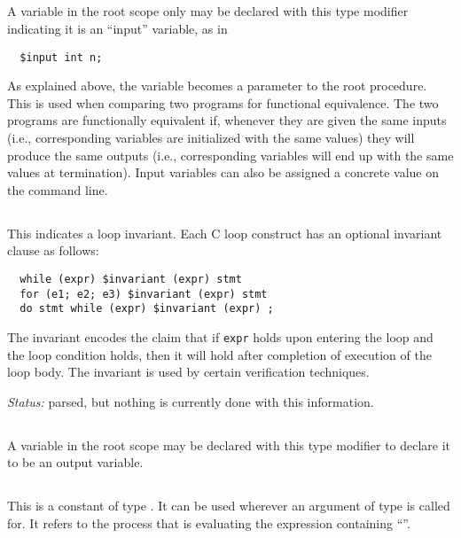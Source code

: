 \subsection{\cinput} A variable in the root scope only may be declared
with this type modifier indicating it is an ``input'' variable, as in
\begin{verbatim}
  $input int n;
\end{verbatim}
As explained above, the variable becomes a parameter to the root
procedure.  This is used when comparing two programs for functional
equivalence.  The two programs are functionally equivalent if,
whenever they are given the same inputs (i.e., corresponding \cinput{}
variables are initialized with the same values) they will produce the
same outputs (i.e., corresponding \coutput{} variables will end up
with the same values at termination).  Input variables can also be
assigned a concrete value on the command line.

\subsection{\cinvariant} This indicates a loop invariant.  Each C loop
construct has an optional invariant clause as follows:
\begin{verbatim}
  while (expr) $invariant (expr) stmt
  for (e1; e2; e3) $invariant (expr) stmt
  do stmt while (expr) $invariant (expr) ;
\end{verbatim}
The invariant encodes the claim that if \texttt{expr} holds upon
entering the loop and the loop condition holds, then it will hold
after completion of execution of the loop body.  The invariant is used
by certain verification techniques.

\emph{Status:} parsed, but nothing is currently done with this
information.

\subsection{\coutput} A variable in the root scope may be declared
with this type modifier to declare it to be an output variable.

\subsection{\cself} This is a constant of type \cproc.  It can be used
wherever an argument of type \cproc{} is called for.  It refers to the
process that is evaluating the expression containing ``\cself''.

